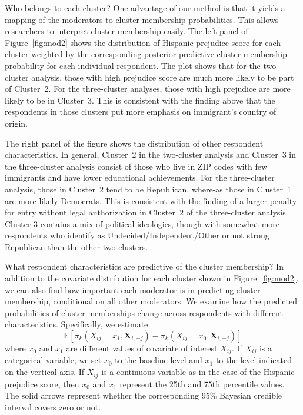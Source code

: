 Who belongs to each cluster? One advantage of our method is that it yields a mapping of the moderators to cluster membership probabilities. This allows researchers to interpret cluster membership easily.
The left panel of Figure~\ref{fig:mod2} shows the distribution of
Hispanic prejudice score for each cluster weighted by the
corresponding posterior predictive cluster membership probability for each
individual respondent.  The plot shows that for the two-cluster
analysis, those with high prejudice score are much more likely to be
part of Cluster~2. For the three-cluster analyses, those with high
prejudice are more likely to be in Cluster~3. This is consistent with
the finding above that the respondents in those clusters put more
emphasis on immigrant's country of origin.

The right panel of the figure shows the distribution of other
respondent characteristics.  In general, Cluster~2 in the two-cluster
analysis and Cluster~3 in the three-cluster analysis consist of those
who live in ZIP codes with few immigrants and have lower educational
achievements.  For the three-cluster analysis, those in Cluster~2 tend
to be Republican, where-as those in Cluster~1 are more likely
Democrats.  This is consistent with the finding of a larger penalty
for entry without legal authorization in Cluster~2 of the
three-cluster analysis.  Cluster 3 contains a mix of political
ideologies, though with somewhat more respondents who identify as
Undecided/Independent/Other or not strong Republican than the other
two clusters.

What respondent characteristics are predictive of the cluster membership? 
In addition to the covariate distribution for each cluster shown in
Figure~\ref{fig:mod2}, we can also find how important each moderator is in predicting cluster membership, conditional on all other moderators.
We examine how the predicted probabilities of cluster
memberships change across respondents with different characteristics.
Specifically, we estimate
\begin{equation}
\label{eq:mfx_moderator}
\mathbb{E}\left[\pi_k(X_{ij} = x_1, \bm{X}_{i,-j}) - \pi_{k}(X_{ij} =
  x_0, \bm{X}_{i,-j})\right]
\end{equation}
where $x_0$ and $x_1$ are different values of covariate of interest
$X_{ij}$.  If $X_{ij}$ is a categorical variable, we set $x_0$ to the
baseline level and $x_1$ to the level indicated on the vertical axis.
If $X_{ij}$ is a continuous variable as in the case of the Hispanic
prejudice score, then $x_0$ and $x_1$ represent the 25th and 75th
percentile values.  The solid arrows represent whether the
corresponding 95\% Bayesian credible interval covers zero or not.


